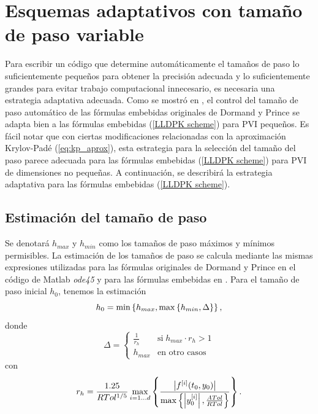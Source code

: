 \section{Esquemas adaptativos con tamaño de paso variable}
Para escribir un código que determine automáticamente el tamaños de paso lo suficientemente pequeños para obtener la precisión adecuada y lo suficientemente grandes para evitar trabajo computacional innecesario, es necesaria una estrategia adaptativa adecuada. Como se mostró en \cite{Jimenez14AMC}, el control del tamaño de paso automático de las fórmulas embebidas originales de Dormand y Prince se adapta bien a las fórmulas embebidas (\ref{LLDPK scheme}) para PVI pequeños. Es fácil notar que con ciertas modificaciones relacionadas con la aproximación Krylov-Padé (\ref{eq:kp_aprox}), esta estrategia para la selección del tamaño del paso parece adecuada para las fórmulas embebidas (\ref{LLDPK scheme}) para PVI de dimensiones no pequeñas. A continuación, se describirá la estrategia adaptativa para las fórmulas embebidas (\ref{LLDPK scheme}).

\subsection{Estimación del tamaño de paso}\label{secc:stepsizes}
Se denotará $h_{max}$ y $h_{min}$ como los tamaños de paso máximos y mínimos permisibles. La estimación de los tamaños de paso se calcula mediante las mismas expresiones utilizadas para las fórmulas originales de Dormand y Prince en el código de Matlab \textit{ode45} \cite{shampine1997matlab} y para las fórmulas embebidas en \cite{Jimenez14AMC}. Para el tamaño de paso inicial $h_0$, tenemos la estimación
\begin{equation}
    h_0 = \min\left\{  h_{max}, \max\left\{  h_{min} ,\Delta \right\}  \right\}, \label{hcero}
\end{equation}
donde
\begin{equation*}
    \Delta = \begin{cases}
        \frac{1}{r_h} & \text{si} \; h_{max}\cdot r_h>1\\
        h_{max} & \text{en otro casos}
        \end{cases}
\end{equation*}
con
\begin{equation*}
     r_h = \frac{1\mathord{.}25}{RTol^{1/5}}\max_{i=1\ldots d}\left\{\frac{ \left\lvert f^{[i]}(t_0,y_0) \right\rvert }
    {\max\left\{ \left\lvert y^{[i]}_0 \right\rvert ,\frac{ATol}{RTol} \right\}}\right\}.
\end{equation*}

